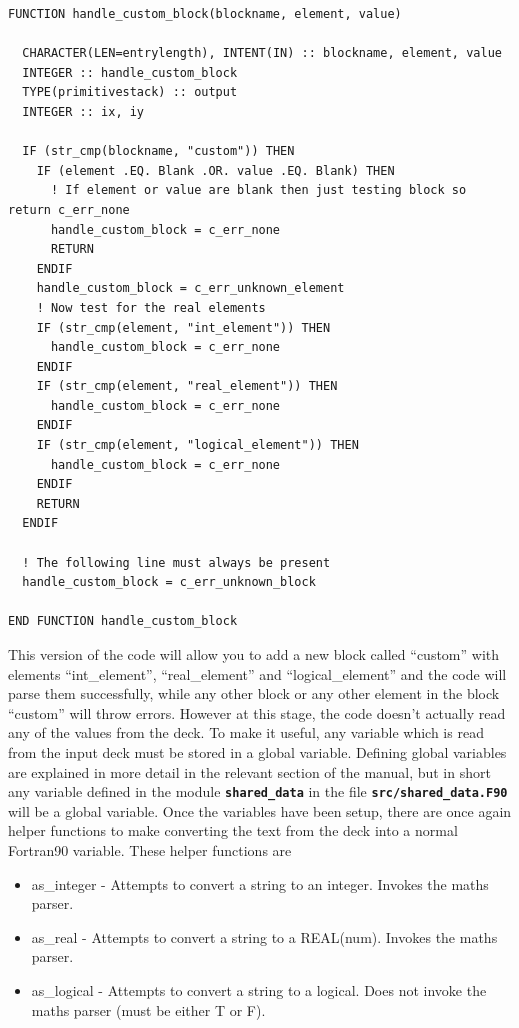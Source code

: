 \documentclass[12pt,a4paper]{article}
\newcommand{\simpleboxverbatim}{\begin{Verbatim}[obeytabs=true,frame=single,
  framerule=0.5mm,rulecolor=\color{warwickmid},formatcom=\color{black}]}
\newcommand{\inlinecode}[1]{{\color{warwickred} \bf\texttt{#1}}}
\begin{document}
\simpleboxverbatim
FUNCTION handle_custom_block(blockname, element, value)

  CHARACTER(LEN=entrylength), INTENT(IN) :: blockname, element, value
  INTEGER :: handle_custom_block
  TYPE(primitivestack) :: output
  INTEGER :: ix, iy

  IF (str_cmp(blockname, "custom")) THEN
    IF (element .EQ. Blank .OR. value .EQ. Blank) THEN
      ! If element or value are blank then just testing block so return c_err_none
      handle_custom_block = c_err_none
      RETURN
    ENDIF
    handle_custom_block = c_err_unknown_element
    ! Now test for the real elements
    IF (str_cmp(element, "int_element")) THEN
      handle_custom_block = c_err_none
    ENDIF
    IF (str_cmp(element, "real_element")) THEN
      handle_custom_block = c_err_none
    ENDIF
    IF (str_cmp(element, "logical_element")) THEN
      handle_custom_block = c_err_none
    ENDIF
    RETURN
  ENDIF

  ! The following line must always be present
  handle_custom_block = c_err_unknown_block

END FUNCTION handle_custom_block
\end{Verbatim}

This version of the code will allow you to add a new block called ``custom''
with elements\linebreak
``int\_element'', ``real\_element'' and ``logical\_element'' and the
code will parse them successfully, while any other block or any other element
in the block ``custom'' will throw errors. However at this stage, the code
doesn't actually read any of the values from the deck. To make it useful, any
variable which is read from the input deck must be stored in a global
variable. Defining global variables are explained in more detail in the
relevant section of the manual, but in short any variable defined in the
module \inlinecode{shared\_data} in the file \inlinecode{src/shared\_data.F90}
will be a global variable. Once the variables have been setup, there are once
again helper functions to make converting the text from the deck into a normal
Fortran90 variable. These helper functions are

\begin{itemize}
\item as\_integer - Attempts to convert a string to an integer. Invokes the
  maths parser.
\item as\_real - Attempts to convert a string to a REAL(num). Invokes the maths
  parser.
\item as\_logical - Attempts to convert a string to a logical. Does not invoke
  the maths parser (must be either T or F).
\end{itemize}
\end{document}
